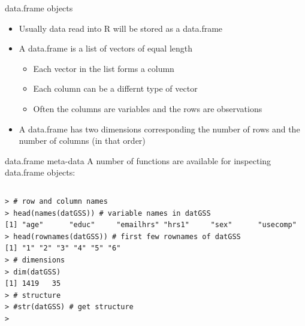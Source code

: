 \documentclass[table,smaller]{beamer}
\begin{document}
\begin{frame}[label=sec-5-1]{data.frame objects}
\begin{itemize}
\item Usually data read into R will be stored as a \alert{data.frame}

\item A data.frame is a list of vectors of equal length
\begin{itemize}
\item Each vector in the list forms a column
\item Each column can be a differnt type of vector
\item Often the columns are variables and the rows are observations
\end{itemize}

\item A data.frame has two dimensions corresponding the number of rows and the number of columns (in that order)
\end{itemize}
\end{frame}
\begin{frame}[fragile,label=sec-5-2]{data.frame meta-data}
 A number of functions are available for inspecting data.frame objects:

\vspace{-.5em}
\begin{columns}
\begin{block}{}
\begin{verbatim}
> # row and column names
> head(names(datGSS)) # variable names in datGSS
[1] "age"      "educ"     "emailhrs" "hrs1"     "sex"      "usecomp" 
> head(rownames(datGSS)) # first few rownames of datGSS
[1] "1" "2" "3" "4" "5" "6"
> # dimensions
> dim(datGSS)
[1] 1419   35
> # structure
> #str(datGSS) # get structure
>
\end{verbatim}
\end{block}
\end{columns}
\vspace{.5em}
\end{frame}
\end{document}
